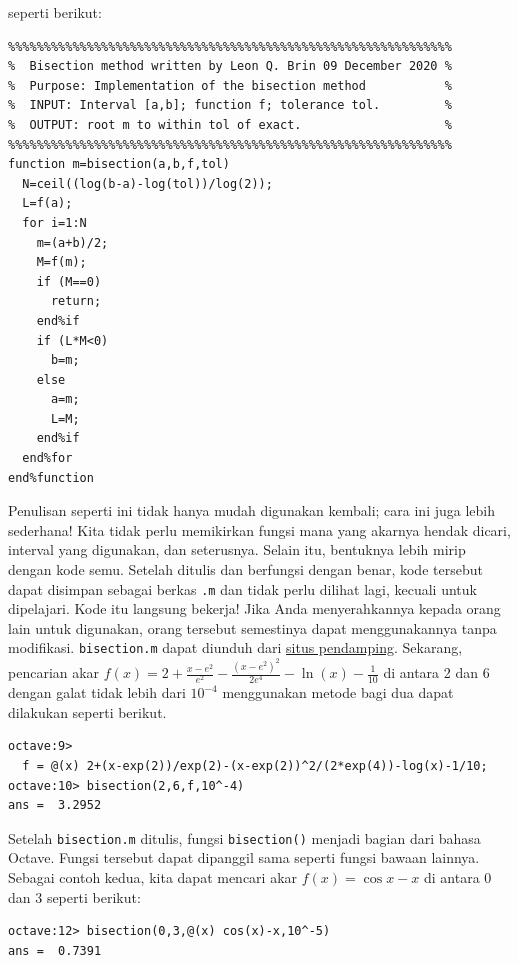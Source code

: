 seperti berikut:\label{bisectionCode} \begin{verbatim}
%%%%%%%%%%%%%%%%%%%%%%%%%%%%%%%%%%%%%%%%%%%%%%%%%%%%%%%%%%%%%%
%  Bisection method written by Leon Q. Brin 09 December 2020 %
%  Purpose: Implementation of the bisection method           %
%  INPUT: Interval [a,b]; function f; tolerance tol.         %
%  OUTPUT: root m to within tol of exact.                    %
%%%%%%%%%%%%%%%%%%%%%%%%%%%%%%%%%%%%%%%%%%%%%%%%%%%%%%%%%%%%%%
function m=bisection(a,b,f,tol)
  N=ceil((log(b-a)-log(tol))/log(2));
  L=f(a);
  for i=1:N
    m=(a+b)/2;
    M=f(m);
    if (M==0)
      return;
    end%if
    if (L*M<0)
      b=m;
    else
      a=m;
      L=M;
    end%if
  end%for
end%function
\end{verbatim} Penulisan seperti ini tidak hanya mudah digunakan kembali; cara ini
juga lebih sederhana! Kita tidak perlu memikirkan fungsi mana yang
akarnya hendak dicari, interval yang digunakan, dan seterusnya. Selain
itu, bentuknya lebih mirip dengan kode semu. Setelah ditulis dan berfungsi
dengan benar, kode tersebut dapat disimpan sebagai berkas \texttt{.m}
dan tidak perlu dilihat lagi, kecuali untuk dipelajari. Kode itu langsung
bekerja! Jika Anda menyerahkannya kepada orang lain untuk digunakan,
orang tersebut semestinya dapat menggunakannya tanpa modifikasi. \texttt{bisection.m}
dapat diunduh dari \href{http://lqbrin.github.io/tea-time-numerical/ancillaries.html}{situs pendamping}.
Sekarang, pencarian akar $f(x)=2+\frac{x-e^{2}}{e^{2}}-\frac{(x-e^{2})^{2}}{2e^{4}}-\ln(x)-\frac{1}{10}$
di antara 2 dan 6 dengan galat tidak lebih dari $10^{-4}$ menggunakan
metode bagi dua dapat dilakukan seperti berikut. \begin{verbatim}
octave:9> 
  f = @(x) 2+(x-exp(2))/exp(2)-(x-exp(2))^2/(2*exp(4))-log(x)-1/10;
octave:10> bisection(2,6,f,10^-4)
ans =  3.2952
\end{verbatim}Setelah \texttt{bisection.m} ditulis, fungsi \texttt{bisection()}
menjadi bagian dari bahasa Octave. Fungsi tersebut dapat dipanggil
sama seperti fungsi bawaan lainnya. Sebagai contoh kedua, kita dapat
mencari akar $f(x)=\cos x-x$ di antara 0 dan 3 seperti berikut: \begin{verbatim}
octave:12> bisection(0,3,@(x) cos(x)-x,10^-5)
ans =  0.7391
\end{verbatim}

\startexercises 


